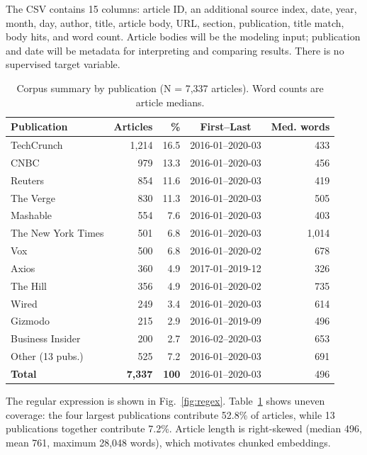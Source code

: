 \documentclass[conference]{IEEEtran}
\begin{document}
The CSV contains 15 columns: article ID, an additional source index, date, year, month, day, author, title, article body, URL, section, publication, title match, body hits, and word count. Article bodies will be the modeling input; publication and date will be metadata for interpreting and comparing results. There is no supervised target variable.

\begin{table}[H]
\caption{Corpus summary by publication (N = 7,337 articles). Word counts are article medians.}
\label{tab:corpus}
\centering
\footnotesize
\setlength{\tabcolsep}{3pt}
\begin{tabular}{lrrcr}
\toprule
\textbf{Publication} & \textbf{Articles} & \textbf{\%} & \textbf{First--Last} & \textbf{Med. words} \\
\midrule
TechCrunch          & 1,214 & 16.5 & 2016-01--2020-03 & 433 \\
CNBC                &   979 & 13.3 & 2016-01--2020-03 & 456 \\
Reuters             &   854 & 11.6 & 2016-01--2020-03 & 419 \\
The Verge           &   830 & 11.3 & 2016-01--2020-03 & 505 \\
Mashable            &   554 &  7.6 & 2016-01--2020-03 & 403 \\
The New York Times  &   501 &  6.8 & 2016-01--2020-03 & 1,014 \\
Vox                 &   500 &  6.8 & 2016-01--2020-02 & 678 \\
Axios               &   360 &  4.9 & 2017-01--2019-12 & 326 \\
The Hill            &   356 &  4.9 & 2016-01--2020-02 & 735 \\
Wired               &   249 &  3.4 & 2016-01--2020-03 & 614 \\
Gizmodo             &   215 &  2.9 & 2016-01--2019-09 & 496 \\
Business Insider    &   200 &  2.7 & 2016-02--2020-03 & 653 \\
Other (13 pubs.)    &   525 &  7.2 & 2016-01--2020-03 & 691 \\
\midrule
\textbf{Total}      & \textbf{7,337} & \textbf{100} & 2016-01--2020-03 & 496 \\
\bottomrule
\end{tabular}
\end{table}

The regular expression is shown in Fig.~\ref{fig:regex}. Table~\ref{tab:corpus}
shows uneven coverage: the four largest publications contribute 52.8\% of
articles, while 13 publications together contribute 7.2\%. Article length is
right-skewed (median 496, mean 761, maximum 28{,}048 words), which motivates
chunked embeddings.
\end{document}
